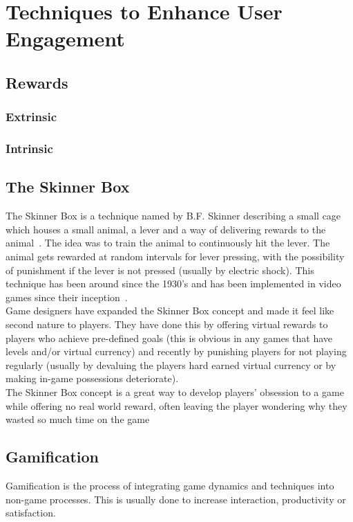 \documentclass[a4paper,12pt]{article}
\begin{document}
\section{Techniques to Enhance User Engagement}\label{sec:techniques-to-enhance}

\subsection{Rewards}\label{sec:rewards}

\subsubsection{Extrinsic}
\subsubsection{Intrinsic}

\subsection{The Skinner Box}
The Skinner Box is a technique named by B.F. Skinner describing a small cage which houses a small animal, a lever and a way of delivering rewards to the animal~\citep{openingSkinersBox}. The idea was to train the animal to continuously hit the lever. The animal gets rewarded at random intervals for lever pressing, with the possibility of punishment if the lever is not pressed (usually by electric shock). This technique has been around since the 1930’s and has been implemented in video games since their inception~\citep{theSkinnerBox}.
\\
Game designers have expanded the Skinner Box concept and made it feel like second nature to players. They have done this by offering virtual rewards to players who achieve pre-defined goals (this is obvious in any games that have levels and/or virtual currency) and recently by punishing players for not playing regularly (usually by devaluing the players hard earned virtual currency or by making in-game possessions deteriorate).
\\
The Skinner Box concept is a great way to develop players’ obsession to a game while offering no real world reward, often leaving the player wondering why they wasted so much time on the game~\citep{fiveCreepyWays} 

\subsection{Gamification}\label{sec:gamification}
Gamification is the process of integrating game dynamics and techniques into non-game processes. This is usually done to increase interaction, productivity or satisfaction.
\end{document}
